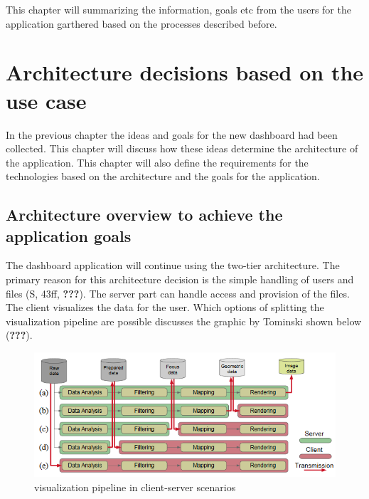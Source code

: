 \documentclass[american,a4paper,oneside,,tablecaptionabove]{scrbook}
\begin{document}
This chapter will summarizing the information, goals etc from the users
for the application garthered based on the processes described before.

\chapter{Architecture decisions based on the use
case}\label{architecture-decisions-based-on-the-use-case}

In the previous chapter the ideas and goals for the new dashboard had
been collected. This chapter will discuss how these ideas determine the
architecture of the application. This chapter will also define the
requirements for the technologies based on the architecture and the
goals for the application.

\section{Architecture overview to achieve the application
goals}\label{architecture-overview-to-achieve-the-application-goals}

The dashboard application will continue using the two-tier architecture.
The primary reason for this architecture decision is the simple handling
of users and files (S, 43ff, {\textbf{???}}). The server part can handle
access and provision of the files. The client visualizes the data for
the user. Which options of splitting the visualization pipeline are
possible discusses the graphic by Tominski shown below ({\textbf{???}}).

\begin{figure}
\centering
\includegraphics{./tex2pdf.19444/e0c5f6b5a33f6a7a2984bb5476a45bc971a5a5f2.png}
\caption{visualization pipeline in client-server scenarios}
\end{figure}
\end{document}
